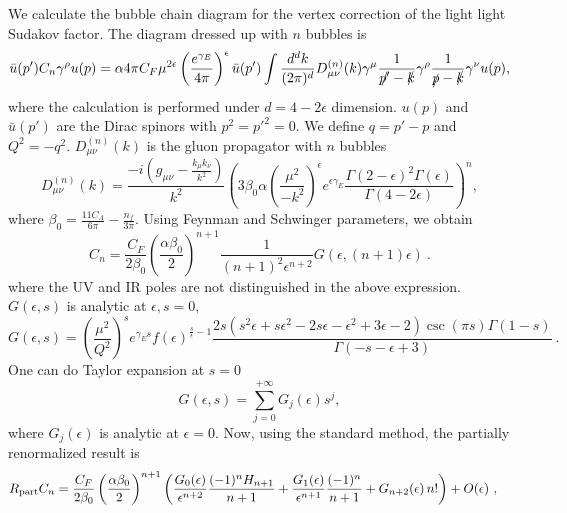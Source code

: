 \documentclass[a4paper,11pt]{article}
\begin{document}
We calculate the bubble chain diagram for the vertex correction of the light light Sudakov factor. The diagram dressed up with $n$ bubbles is
\begin{equation}
    \bar{u}(p') C_n\gamma^{\rho} u(p) = \alpha 4 \pi C_F \mu^{2 \epsilon} \left(\frac{e^{\gamma_E}}{4\pi}\right)^{\epsilon} \bar{u}(p') \int \frac{d^{d}k}{(2\pi)^d} D^{(n)}_{\mu \nu}(k) \gamma^{\mu} \frac{1}{\slashed{p'}-\slashed{k}} \gamma^{\rho} \frac{1}{\slashed{p}-\slashed{k}} \gamma^{\nu} u(p),
\end{equation}
where the calculation is performed under $d=4-2\epsilon$ dimension. $u(p)$ and $\bar{u}(p')$ are the Dirac spinors with $p^2=p'^2=0$. We define $q=p'-p$ and $Q^2=-q^2$. $D^{(n)}_{\mu \nu}(k)$ is the gluon propagator with $n$ bubbles
\begin{equation}
D^{(n)}_{\mu \nu}(k) = \frac{-i \left(g_{\mu \nu}-\frac{k_{\mu}k_{\nu}}{k^2}\right)}{k^2} \left(3 \beta_0 \alpha \left(\frac{\mu^2}{-k^2}\right)^{\epsilon} e^{\epsilon \gamma_E} \frac{\Gamma(2-\epsilon)^2 \Gamma(\epsilon)}{\Gamma(4-2\epsilon)}\right)^n,
\end{equation}
where $\beta_0 = \frac{11 C_A}{6 \pi} - \frac{n_f}{3\pi}$. Using Feynman and Schwinger parameters, we obtain
\begin{equation}
    C_n= 
    \frac{C_F}{2 \beta_0} \left(\frac{\alpha \beta_0}{2}\right)^{n+1} \frac{1}{(n+1)^2 \epsilon^{n+2}} G(\epsilon,(n+1)\epsilon) \ .
\end{equation}
where the UV and IR poles are not distinguished in the above expression. $G(\epsilon,s)$ is analytic at $\epsilon,s=0$,  
\begin{equation}\label{eq:Ges}
G(\epsilon,s)=\left(\frac{\mu ^2}{Q^2}\right)^s e^{\gamma_E  s} f(\epsilon)^{\frac{s}{\epsilon }-1} \frac{2 s \left(s^2 \epsilon +s \epsilon ^2-2 s \epsilon -\epsilon ^2+3 \epsilon -2\right) \csc (\pi  s) \Gamma (1-s)}{\Gamma (-s-\epsilon +3)} \ .
\end{equation}
One can do Taylor expansion at $s=0$
\begin{equation}\label{eq:Gexpand}
    G(\epsilon,s)=\sum_{j=0}^{+\infty} G_{j}(\epsilon) s^j,
\end{equation}
where $G_{j}(\epsilon)$ is analytic at $\epsilon=0$. Now, using the standard method, the partially renormalized result is
\begin{align}
    &R_{\rm part}C_n =\frac{C_F}{2\beta_0} \left( \frac{\alpha\beta_0}{2}\right)^{n+1} \left( \frac{G_0(\epsilon)}{\epsilon^{n+2}} \frac{(-1)^n H_{n+1}}{n+1} + \frac{G_1(\epsilon)}{\epsilon^{n+1}} \frac{(-1)^n}{n+1} + G_{n+2}(\epsilon) \, n! \right) + O(\epsilon) \ ,
\end{align}
\end{document}
